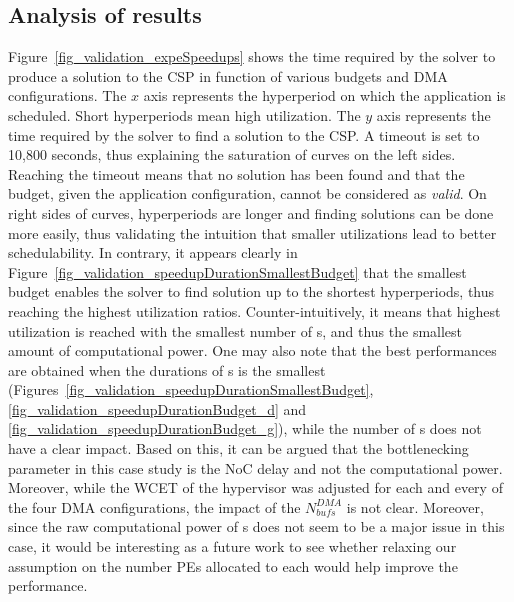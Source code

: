 \documentclass[main.tex]{subfiles}
\begin{document}
\subsection{Analysis of results}
Figure~\ref{fig_validation_expeSpeedups} shows the time required by the solver to produce a solution to the CSP in function of various budgets and DMA configurations. The $x$ axis represents the hyperperiod on which the application is scheduled. Short hyperperiods mean high utilization. The $y$ axis represents the time required by the solver to find a solution to the CSP. A timeout is set to 10,800 seconds, thus explaining the saturation of curves on the left sides. Reaching the timeout means that no solution has been found and that the budget, given the application configuration, cannot be considered as \emph{valid}. On right sides of curves, hyperperiods are longer and finding solutions can be done more easily, thus validating the intuition that smaller utilizations lead to better schedulability.
In contrary, it appears clearly in Figure~\ref{fig_validation_speedupDurationSmallestBudget} that the smallest budget enables the solver to find solution up to the shortest hyperperiods, thus reaching the highest utilization ratios. Counter-intuitively, it means that highest utilization is reached with the smallest number of \PN{}s, and thus the smallest amount of computational power. One may also note that the best performances are obtained when the durations of \PC{}s is the smallest (Figures~\ref{fig_validation_speedupDurationSmallestBudget}, \ref{fig_validation_speedupDurationBudget_d} and \ref{fig_validation_speedupDurationBudget_g}), while the number of \PN{}s does not have a clear impact. Based on this, it can be argued that the bottlenecking parameter in this case study is the NoC delay and not the computational power. Moreover, while the WCET of the hypervisor was adjusted for each and every of the four DMA configurations, the impact of the $N_{bufs}^{DMA}$ is not clear. Moreover, since the raw computational power of \PN{}s does not seem to be a major issue in this case, it would be interesting as a future work to see whether relaxing our assumption on the number PEs allocated to each \PN{} would help improve the performance. 
\end{document}
